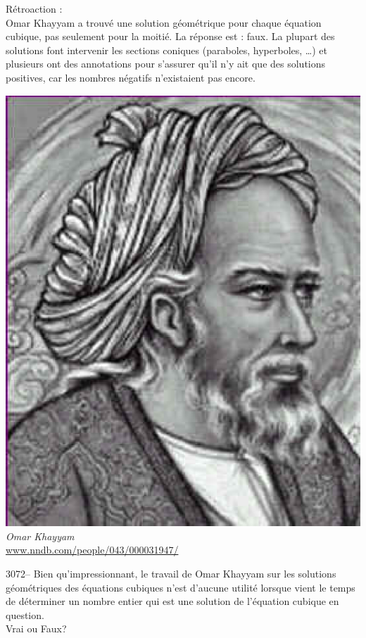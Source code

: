 \documentclass[letterpaper, 12pt]{article}
\begin{document}
R\'etroaction :\\
Omar Khayyam a trouv\'e une solution g\'eom\'etrique pour chaque \'equation cubique, pas seulement pour la moiti\'e. La r\'eponse est : faux. La plupart des solutions font intervenir les sections coniques (paraboles, hyperboles, \dots) et plusieurs ont des annotations pour s'assurer qu'il n'y ait que des solutions positives, car les nombres n\'egatifs n'existaient pas encore.
\begin{center}
\includegraphics[scale=0.3]{Omar_Khayyam.eps}\\
\emph{{\small Omar Khayyam}}\\
\href{http://www.nndb.com/people/043/000031947/}{www.nndb.com/people/043/000031947/}\\[5mm]
\end{center}



3072-- Bien qu'impressionnant, le travail de Omar Khayyam sur les solutions g\'eom\'etriques des \'equations cubiques n'est d'aucune utilit\'e lorsque vient le temps de d\'eterminer un nombre entier qui est une solution de l'\'equation cubique en question.\\
Vrai ou Faux?\\
\end{document}
